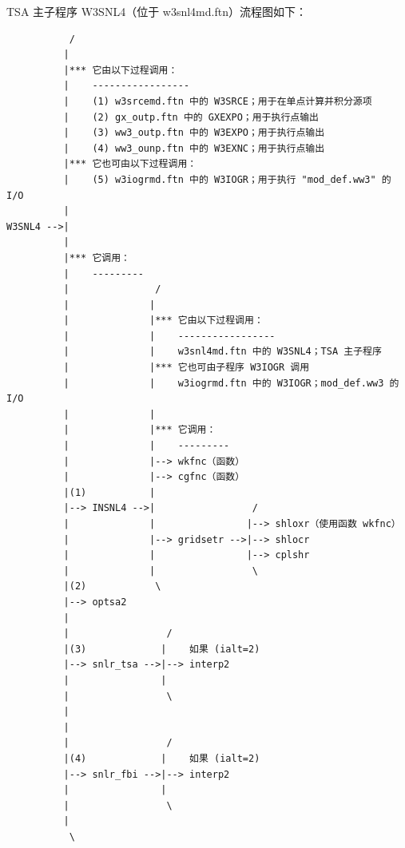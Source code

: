 TSA 主子程序 W3SNL4（位于 w3snl4md.ftn）流程图如下：
{\footnotesize 
\begin{verbatim}
           /
          |
          |*** 它由以下过程调用：
          |    -----------------
          |    (1) w3srcemd.ftn 中的 W3SRCE；用于在单点计算并积分源项
          |    (2) gx_outp.ftn 中的 GXEXPO；用于执行点输出
          |    (3) ww3_outp.ftn 中的 W3EXPO；用于执行点输出
          |    (4) ww3_ounp.ftn 中的 W3EXNC；用于执行点输出
          |*** 它也可由以下过程调用：
          |    (5) w3iogrmd.ftn 中的 W3IOGR；用于执行 "mod_def.ww3" 的 I/O
          |
W3SNL4 -->| 
          |
          |*** 它调用：
          |    ---------
          |               /
          |              |
          |              |*** 它由以下过程调用：
          |              |    -----------------
          |              |    w3snl4md.ftn 中的 W3SNL4；TSA 主子程序
          |              |*** 它也可由子程序 W3IOGR 调用
          |              |    w3iogrmd.ftn 中的 W3IOGR；mod_def.ww3 的 I/O
          |              |
          |              |*** 它调用：
          |              |    ---------
          |              |--> wkfnc（函数）
          |              |--> cgfnc（函数）
          |(1)           |
          |--> INSNL4 -->|                 /
          |              |                |--> shloxr（使用函数 wkfnc）
          |              |--> gridsetr -->|--> shlocr
          |              |                |--> cplshr
          |              |                 \
          |(2)            \
          |--> optsa2
          |
          |                 /
          |(3)             |    如果 (ialt=2)
          |--> snlr_tsa -->|--> interp2
          |                |
          |                 \
          |
          |
          |                 /
          |(4)             |    如果 (ialt=2)
          |--> snlr_fbi -->|--> interp2
          |                |
          |                 \
          |
           \ 
\end{verbatim}
 }
